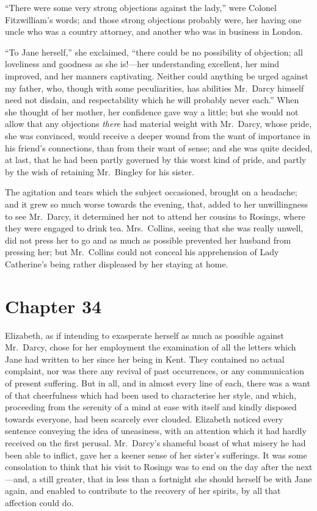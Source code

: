 ``There were some very strong objections against the lady,''
were Colonel Fitzwilliam's words; and those strong objections
probably were, her having one uncle who was a country attorney,
and another who was in business in London.

``To Jane herself,'' she exclaimed, ``there could be no possibility
of objection; all loveliness and goodness as she is!---her
understanding excellent, her mind improved, and her manners
captivating.  Neither could anything be urged against my father,
who, though with some peculiarities, has abilities Mr.\ Darcy
himself need not disdain, and respectability which he will
probably never each.''  When she thought of her mother, her
confidence gave way a little; but she would not allow that any
objections \emph{there} had material weight with Mr.\ Darcy, whose
pride, she was convinced, would receive a deeper wound from
the want of importance in his friend's connections, than from
their want of sense; and she was quite decided, at last, that he
had been partly governed by this worst kind of pride, and partly
by the wish of retaining Mr.\ Bingley for his sister.

The agitation and tears which the subject occasioned, brought on
a headache; and it grew so much worse towards the evening,
that, added to her unwillingness to see Mr.\ Darcy, it determined
her not to attend her cousins to Rosings, where they were
engaged to drink tea.  Mrs.\ Collins, seeing that she was really
unwell, did not press her to go and as much as possible
prevented her husband from pressing her; but Mr.\ Collins could
not conceal his apprehension of Lady Catherine's being rather
displeased by her staying at home.



\chapter{Chapter 34}


 Elizabeth, as if intending to exasperate
herself as much as possible against Mr.\ Darcy, chose for her
employment the examination of all the letters which Jane had
written to her since her being in Kent.  They contained no actual
complaint, nor was there any revival of past occurrences, or any
communication of present suffering.  But in all, and in almost
every line of each, there was a want of that cheerfulness which
had been used to characterise her style, and which, proceeding
from the serenity of a mind at ease with itself and kindly
disposed towards everyone, had been scarcely ever clouded.
Elizabeth noticed every sentence conveying the idea of uneasiness,
with an attention which it had hardly received on the first
perusal.  Mr.\ Darcy's shameful boast of what misery he had been
able to inflict, gave her a keener sense of her sister's
sufferings.  It was some consolation to think that his visit
to Rosings was to end on the day after the next---and, a still
greater, that in less than a fortnight she should herself be with
Jane again, and enabled to contribute to the recovery of her
spirits, by all that affection could do.

